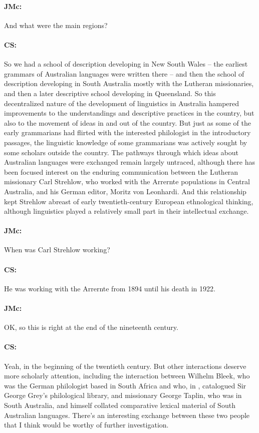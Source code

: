\documentclass[output=paper]{langscibook}
\begin{document}
\paragraph*{JMc:}  And what were the main regions?


\paragraph*{CS:}  So we had a school of description developing in New South Wales – the earliest grammars of Australian languages were written there – and then the school of description developing in South Australia mostly with the Lutheran missionaries, and then a later descriptive school developing in Queensland. So this decentralized nature of the development of linguistics in Australia hampered improvements to the understandings and descriptive practices in the country, but also to the movement of ideas in and out of the country. But just as some of the early grammarians had flirted with the interested philologist in the introductory passages, the linguistic knowledge of some grammarians was actively sought by some scholars outside the country. The pathways through which ideas about Australian languages were exchanged remain largely untraced, although there has been focused interest on the enduring communication between the Lutheran missionary Carl Strehlow, who worked with the Arrernte populations in Central Australia, and his German editor, Moritz von Leonhardi. And this relationship kept Strehlow abreast of early twentieth-century European ethnological thinking, although linguistics played a relatively small part in their intellectual exchange.


\paragraph*{JMc:}  When was Carl Strehlow working?


\paragraph*{CS:}  He was working with the Arrernte from 1894 until his death in 1922.


\paragraph*{JMc:}  OK, so this is right at the end of the nineteenth century.


\paragraph*{CS:}  Yeah, in the beginning of the twentieth century. But other interactions deserve more scholarly attention, including the interaction between Wilhelm Bleek, who was the German philologist based in South Africa and who, in \citeyear{bleek1858a}, catalogued Sir George Grey’s philological library, and missionary George Taplin, who was in South Australia, and himself collated comparative lexical material of South Australian languages. There’s an interesting exchange between these two people that I think would be worthy of further investigation.
\end{document}
